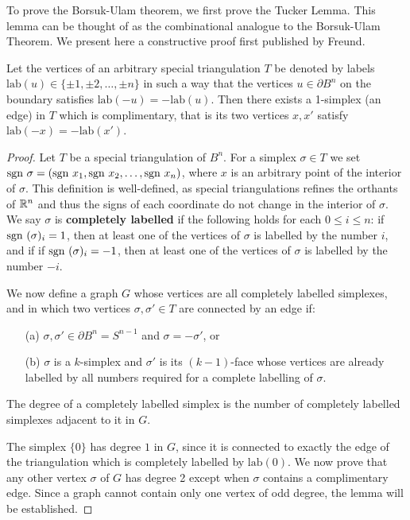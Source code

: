 To prove the Borsuk-Ulam theorem, we first prove the Tucker Lemma. This lemma can be thought of as the combinational analogue to the Borsuk-Ulam Theorem.
We present here a constructive proof first published by Freund.\cite{freund1981constructive}
\begin{lemma}
    Let the vertices of an arbitrary special triangulation $T$ be denoted by labels $\text{lab} (u) \in \{\pm1, \pm2,\dots ,\pm n\}$
    in such a way that the vertices $u \in \partial B^n$ on the boundary satisfies $\text{lab} (-u) = -\text{lab} (u)$. Then there exists a 1-simplex (an edge) in $T$ which is complimentary, that is its two vertices $x,x'$ satisfy $\text{lab} (-x) = -\text{lab} (x')$.
\end{lemma} 
\begin{proof}
    Let $T$ be a special triangulation of $B^n$. For a simplex $\sigma \in T$ we set $\text{sgn } \sigma = (\text{sgn } x_1, \text{sgn } x_2, \dots, \text{sgn } x_n)$, where $x$ is an arbitrary point 
    of the interior of $\sigma$. This definition is well-defined, as special triangulations refines the orthants of $\mathbb R^n$ and thus the signs of each coordinate do not change in the interior of $\sigma$. 
    We say $\sigma$ is \textbf{completely labelled} if the following holds for each $0\leq i\leq n$: if $\text{sgn }(\sigma)_i =1$, then at least one of the vertices of $\sigma$ is labelled by the number $i$, and if 
    if $\text{sgn }(\sigma)_i =-1$, then at least one of the vertices of $\sigma$ is labelled by the number $-i$.

    We now define a graph $G$ whose vertices are all completely labelled simplexes, and in which two vertices $\sigma, \sigma' \in T$ are connected by an edge if:
    \begin{enumerate}
        \item[(a)] $\sigma, \sigma' \in \partial B^n = S^{n-1}$ and $\sigma = -\sigma'$, or
        \item[(b)] $\sigma$ is a $k$-simplex and $\sigma'$ is its $(k-1)$-face whose vertices are already labelled by all numbers required for a complete labelling of $\sigma$.
    \end{enumerate}

    The degree of a completely labelled simplex is the number of completely labelled simplexes adjacent to it in $G$.

    The simplex $\{0\}$ has degree $1$ in $G$, since it is connected to exactly the edge of the triangulation which is completely labelled by $\text{lab}(0)$. 
    We now prove that any other vertex $\sigma$ of $G$ has degree 2 except when $\sigma$ contains a complimentary edge. 
    Since a graph cannot contain only one vertex of odd degree, the lemma will be established. 


\end{proof}
